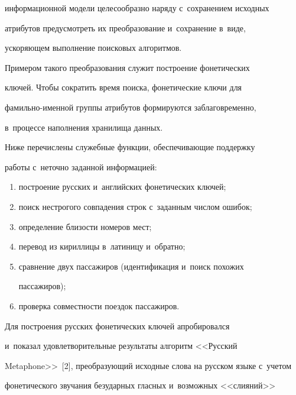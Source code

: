информационной модели целесообразно наряду с~сохранением исходных 


атрибутов предусмотреть их преобразование и~сохранение в~виде, 


ускоряющем выполнение поисковых алгоритмов.


      


      Примером такого преобразования служит построение фонетических 


ключей. Чтобы сократить время поиска, фонетические ключи для  


фа\-миль\-но-имен\-ной группы атрибутов формируются заблаговременно, 


в~процессе наполнения хранилища данных.


      


      Ниже перечислены служебные функции, обеспечивающие поддержку 


работы с~неточно заданной информацией:


\begin{enumerate}[(1)]


\item построение русских и~английских фонетических ключей;


\item поиск нестрогого совпадения строк с~заданным числом ошибок;


\item определение близости номеров мест;


\item перевод из кириллицы в~латиницу и~обратно;


\item сравнение двух пассажиров (идентификация и~поиск похожих 


пассажиров);


\item проверка совместности поездок пассажиров.


\end{enumerate}


      


      Для построения русских фонетических ключей апробировался 


и~показал удовлетворительные результаты алгоритм <<Русский 


Metaphone>>~[2], преобразующий исходные слова на русском языке с~учетом 


фонетического звучания безударных гласных и~возможных <<слияний>> 


